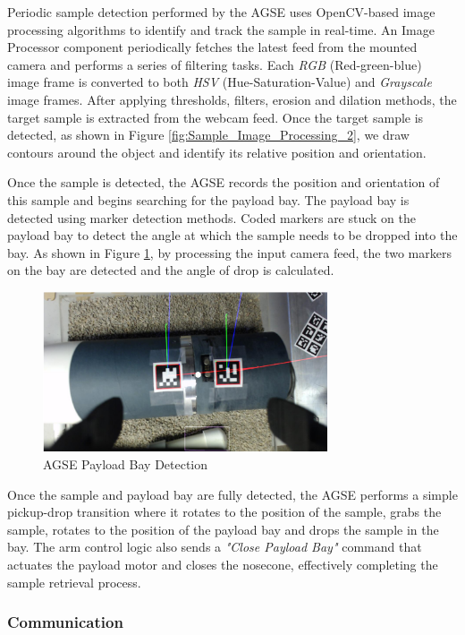 Periodic sample detection performed by the AGSE uses OpenCV-based
image processing algorithms to identify and track the sample in
real-time. An Image Processor component periodically fetches the
latest feed from the mounted camera and performs a series of filtering
tasks. Each \emph{RGB} (Red-green-blue) image frame is converted to
both \emph{HSV} (Hue-Saturation-Value) and \emph{Grayscale} image
frames. After applying thresholds, filters, erosion and dilation
methods, the target sample is extracted from the webcam feed. Once the
target sample is detected, as shown in Figure
\ref{fig:Sample_Image_Processing_2}, we draw contours around the
object and identify its relative position and orientation.

Once the sample is detected, the AGSE records the position and
orientation of this sample and begins searching for the payload
bay. The payload bay is detected using marker detection methods. Coded
markers are stuck on the payload bay to detect the angle at which the
sample needs to be dropped into the bay. As shown in Figure
\ref{fig:Payloadbay_Detection}, by processing the input camera feed,
the two markers on the bay are detected and the angle of drop is
calculated.

\begin{figure}[h]
	\centering
	\includegraphics[width=0.75\textwidth]{Figures/Payloadbay_Detection.png}
	\caption{AGSE Payload Bay Detection}
	\label{fig:Payloadbay_Detection}
\end{figure}

Once the sample and payload bay are fully detected, the AGSE performs
a simple pickup-drop transition where it rotates to the position of
the sample, grabs the sample, rotates to the position of the payload
bay and drops the sample in the bay. The arm control logic also sends
a \emph{"Close Payload Bay"} command that actuates the payload motor
and closes the nosecone, effectively completing the sample retrieval
process.

\subsubsection{Communication}


